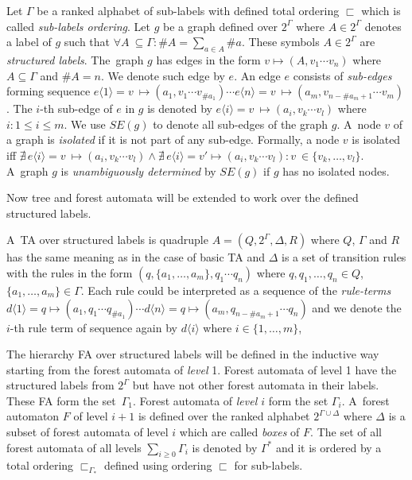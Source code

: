 \documentclass[a4paper, 12pt]{article}
\begin{document}
Let $\Gamma$ be a ranked alphabet of sub-labels with defined total ordering $\sqsubset$ which is called \emph{sub-labels ordering}.
Let $g$ be a graph defined over $2^\Gamma$ where $A \in 2^\Gamma$ denotes a label of $g$
such that $\forall A~\subseteq \Gamma: \#A = \sum_{a\in A} \#a$.
These symbols $A \in 2^\Gamma$ are \emph{structured labels}.
The~graph $g$ has edges in the form $v \mapsto (A,v_1 \cdots v_n)$ where
$A \subseteq \Gamma$ and $\#A = n$.
We denote such edge by $e$.
An edge $e$ consists of \emph{sub-edges} forming sequence
$e\langle 1\rangle = v~\mapsto (a_1,v_1 \cdots v_{\#a_1}) \cdots e\langle n\rangle= v~\mapsto (a_m,v_{n-\#a_m+1} \cdots v_m)$.
The $i$-th sub-edge of $e$ in $g$ is denoted by $e\langle i\rangle = v~\mapsto (a_i,v_k \cdots v_l)$ where $i: 1 \leq i \leq m$.
We use $SE(g)$ to denote all sub-edges of the graph $g$.
A~node $v$ of a graph is \emph{isolated} if it is not part of any sub-edge.
Formally, a node $v$ is isolated
iff $\nexists\, e\langle i\rangle = v~\mapsto (a_i,v_k \cdots v_l) \wedge \nexists\, e\langle i\rangle = v' \mapsto (a_i,v_k \cdots v_l): v~\in \{v_k,\ldots, v_l\}$.
A~graph $g$ is \emph{unambiguously determined} by $SE(g)$ if $g$ has no isolated nodes.


Now tree and forest automata will be extended to work over the defined structured labels.

A~TA over structured labels is quadruple $A=(Q,2^\Gamma, \Delta, R)$
where $Q$, $\Gamma$ and $R$ has the same meaning as in the case of basic TA and
	$\Delta$ is a set of transition rules with the rules in the form
		$(q,\{a_1,\ldots,a_m\},q_1 \cdots q_n)$
		where $q,q_1,\ldots,q_n \in Q$, $\{a_1,\ldots,a_m\} \in \Gamma$.
	Each rule could be interpreted as a sequence of the \emph{rule-terms}
	$d\langle 1\rangle = q \mapsto (a_1,q_1 \cdots q_{\#a_1}) \cdots d\langle n\rangle= q \mapsto (a_m,q_{n-\#a_m+1} \cdots q_n)$ and
	we denote the $i$-th rule term of sequence again by $d\langle i\rangle$ where $i \in \{1,\ldots,m\}$,

The hierarchy FA over structured labels will be defined in the inductive way
starting from the forest automata of \emph{level} 1.
Forest automata of level 1 have the structured labels from $2^\Gamma$ but
have not other forest automata in their labels.
These FA form the set~$\Gamma_1$.
Forest automata of \emph{level $i$} form the set $\Gamma_i$.
A~forest automaton $F$ of level $i+1$ is defined over the ranked alphabet $2^{\Gamma \cup \Delta}$
where $\Delta$ is a subset of forest automata of level $i$ which are called \emph{boxes} of $F$.
The set of all forest automata of all levels $\sum_{i \geq 0} \Gamma_i$ is denoted by $\Gamma^{*}$ and
it is ordered by a total ordering $\sqsubset_{\Gamma_*}$ defined using ordering $\sqsubset$ for sub-labels.
\end{document}
